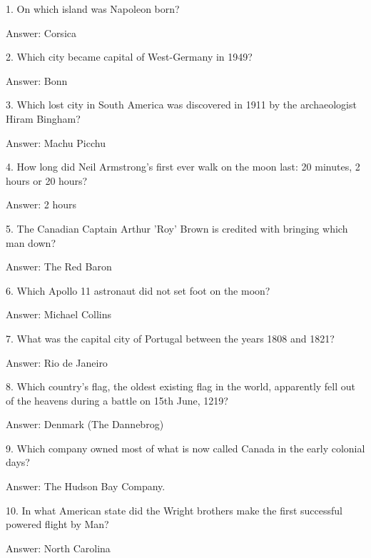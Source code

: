 \documentclass{beamer}
\begin{document}
    \begin{frame}
        1. On which island was Napoleon born?

        Answer: Corsica
    \end{frame}

    \begin{frame}
        2. Which city became capital of West-Germany in 1949?

        Answer: Bonn
    \end{frame}

    \begin{frame}
        3. Which lost city in South America was discovered in 1911 by the
        archaeologist Hiram Bingham?

        Answer: Machu Picchu
    \end{frame}

    \begin{frame}
        4. How long did Neil Armstrong’s first ever walk on the moon last: 20
        minutes, 2 hours or 20 hours?

        Answer: 2 hours
    \end{frame}

    \begin{frame}
        5. The Canadian Captain Arthur 'Roy' Brown is credited with bringing
        which man down?

        Answer: The Red Baron
    \end{frame}

    \begin{frame}
        6. Which Apollo 11 astronaut did not set foot on the moon?

        Answer: Michael Collins
    \end{frame}

    \begin{frame}
        7. What was the capital city of Portugal between the years 1808 and
        1821?

        Answer: Rio de Janeiro
    \end{frame}

    \begin{frame}
        8. Which country's flag, the oldest existing flag in the world,
        apparently fell out of the heavens during a battle on 15th June, 1219?

        Answer: Denmark (The Dannebrog)
    \end{frame}

    \begin{frame}
        9.  Which company owned most of what is now called Canada in the early
        colonial days?

        Answer: The Hudson Bay Company.
    \end{frame}

    \begin{frame}
        10. In what American state did the Wright brothers make the first
        successful powered flight by Man?

        Answer: North Carolina
    \end{frame}
\end{document}
